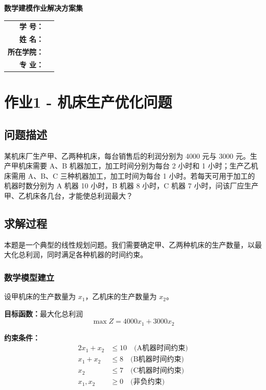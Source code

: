 \documentclass[bwprint]{cumcmthesis}
\newcommand{\studentid}{24103219} %
\newcommand{\studentname}{贺江阳} %
\newcommand{\college}{人工智能学院} %
\newcommand{\major}{软件工程} %
\renewcommand{\maketitle}{
  \begin{titlepage}
    \begin{center}
      \vspace*{2cm}
      {\huge\bfseries 数学建模作业解决方案集\par}
      \vspace{2cm}
      
      \begin{tabular}{rl}
        \Large\textbf{学 \quad 号：} & \Large\underline{\makebox[8cm]{\studentid}} \\[12pt]
        \Large\textbf{姓 \quad 名：} & \Large\underline{\makebox[8cm]{\studentname}} \\[12pt]
        \Large\textbf{所在学院：} & \Large\underline{\makebox[8cm]{\college}} \\[12pt]
        \Large\textbf{专 \quad 业：} & \Large\underline{\makebox[8cm]{\major}} \\[12pt]
      \end{tabular}
      
    \end{center}
  \end{titlepage}
}
\begin{document}
\maketitle

\cleardoublepage %

\pagestyle{empty}    %
\tableofcontents     %

\cleardoublepage     %
\pagestyle{plain}    %
         


\section{作业1 - 机床生产优化问题}

\subsection{问题描述}
某机床厂生产甲、乙两种机床，每台销售后的利润分别为 4000 元与 3000 元。生产甲机床需要 A、B 机器加工，加工时间分别为每台 2 小时和 1 小时；生产乙机床需用 A、B、C 三种机器加工，加工时间为每台 1 小时。若每天可用于加工的机器时数分别为 A 机器 10 小时，B 机器 8 小时，C 机器 7 小时，问该厂应生产甲、乙机床各几台，才能使总利润最大？

\subsection{求解过程}
本题是一个典型的线性规划问题。我们需要确定甲、乙两种机床的生产数量，以最大化总利润，同时满足各种机器的时间约束。

\subsubsection{数学模型建立}

设甲机床的生产数量为 $x_1$，乙机床的生产数量为 $x_2$。

\textbf{目标函数：}最大化总利润
\begin{equation}
\max Z = 4000x_1 + 3000x_2
\end{equation}

\textbf{约束条件：}
\begin{align}
2x_1 + x_2 &\leq 10 \quad \text{(A机器时间约束)} \\
x_1 + x_2 &\leq 8 \quad \text{(B机器时间约束)} \\
x_2 &\leq 7 \quad \text{(C机器时间约束)} \\
x_1, x_2 &\geq 0 \quad \text{(非负约束)}
\end{align}
\end{document}
